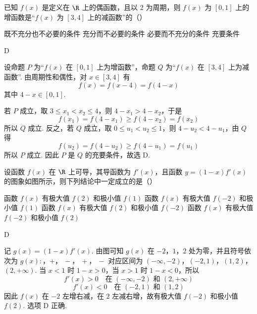 \begin{problem}
已知 \(f(x)\) 是定义在 \(\R\) 上的偶函数，且以 2 为周期，则 \(f(x)\) 为 \([0,1]\) 上的增函数是“\(f(x)\) 为 \([3,4]\) 上的减函数”的（\quad）

\choices
    {既不充分也不必要的条件}
    {充分而不必要的条件}
    {必要而不充分的条件}
    {充要条件}

\begin{answer}
D
\end{answer}

\begin{solution}
设命题 \(P\) 为“\(f(x)\) 在 \([0,1]\) 上为增函数”，命题 \(Q\) 为“\(f(x)\) 在 \([3,4]\) 上为减函数”. 由周期性和偶性，对 \(x\in[3,4]\) 有
\[
f(x)=f(x-4)=f(4-x)
\]
其中 \(4-x\in[0,1]\).

若 \(P\) 成立，取 \(3\le x_{1}<x_{2}\le4\)，则 \(4-x_{1}>4-x_{2}\)，于是
\[
f(x_{1})=f(4-x_{1})\ge f(4-x_{2})=f(x_{2})
\]
所以 \(Q\) 成立. 反之，若 \(Q\) 成立，取 \(0\le u_{1}<u_{2}\le1\)，则 \(4-u_{2}<4-u_{1}\)，由 \(Q\) 得
\[
f(u_{2})=f(4-u_{2})\ge f(4-u_{1})=f(u_{1})
\]
所以 \(P\) 成立. 因此 \(P\) 是 \(Q\) 的充要条件，故选 D.
\end{solution}
\end{problem}

\begin{problem}
设函数 \( f(x) \) 在 \( \R \) 上可导，其导函数为 \( f'(x) \)，且函数 \( y = (1 - x)f'(x) \) 的图象如图所示，则下列结论中一定成立的是（\quad）


\choices
    {函数 \( f(x) \) 有极大值 \( f(2) \) 和极小值 \( f(1) \)}
    {函数 \( f(x) \) 有极大值 \( f(-2) \) 和极小值 \( f(1) \)}
    {函数 \( f(x) \) 有极大值 \( f(2) \) 和极小值 \( f(-2) \)}
    {函数 \( f(x) \) 有极大值 \( f(-2) \) 和极小值 \( f(2) \)}

\begin{answer}
D
\end{answer}

\begin{solution}
记 \(g(x)=(1-x)f'(x)\). 由图可知 \(g(x)\) 在 \(-2\)，\(1\)，\(2\) 处为零，并且符号依次为
\(g(x):\)，\(+\)，\(\ -\)，\(\ +\)，\(\ -\)
对应区间为 \((-\infty,-2)\)，\((-2,1)\)，\((1,2)\)，\((2,+\infty)\). 当 \(x<1\) 时 \(1-x>0\)，当 \(x>1\) 时 \(1-x<0\)，所以
\[
f'(x)>0\quad\text{在 }(-\infty,-2)\text{ 和 }(2,+\infty)
\]
\[
f'(x)<0\quad\text{在 }(-2,1)\text{ 和 }(1,2)
\]
因此 \(f(x)\) 在 \(-2\) 左增右减，在 \(2\) 左减右增，故有极大值 \(f(-2)\) 和极小值 \(f(2)\). 选项 D 正确.
\end{solution}
\end{problem}

